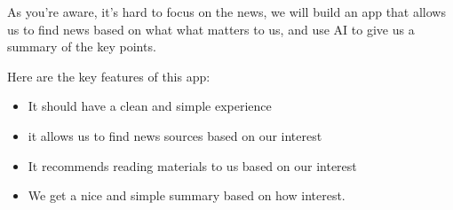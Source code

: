\documentclass[11pt]{article}
\begin{document}
    As you're aware, it's hard to focus on the news,
    we will build an app that allows us to find news based on what what matters to us,
    and use AI to give us a summary of the key points.

    Here are the key features of this app:

    \begin{itemize}
        \item It should have a clean and simple experience
        \item it allows us to find news sources based on our interest
        \item It recommends reading materials to us based on our interest
        \item We get a nice and simple summary based on how interest.
    \end{itemize}
\end{document}
